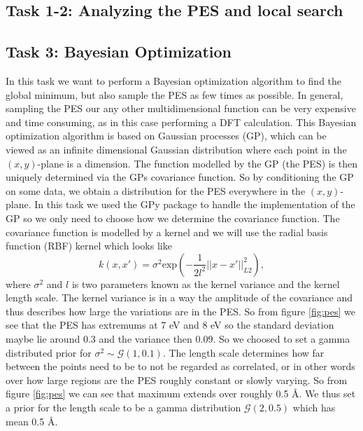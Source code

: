 \documentclass[11pt,a4paper]{article}
\begin{document}
\subsection[Task 1]{Task 1-2: Analyzing the PES and local search}
\label{sec:method_task12}

\subsection[Task 1]{Task 3: Bayesian Optimization}
\label{sec:method_task3}
In this task we want to perform a Bayesian optimization algorithm to find the global minimum, but also sample the PES as few times as possible. In general, sampling the PES our any other multidimensional function can be very expensive and time consuming, as in this case performing a DFT calculation. This Bayesian optimization algorithm is based on Gaussian processes (GP), which can be viewed as an infinite dimensional Gaussian distribution where each point in the $(x,y)$-plane is a dimension. The function modelled by the GP (the PES) is then uniquely determined via the GPs covariance function. So by conditioning the GP on some data, we obtain a distribution for the PES everywhere in the $(x,y)$-plane. In this task we used the GPy package to handle the implementation of the GP so we only need to choose how we determine the covariance function. The covariance function is modelled by a kernel and we will use the radial basis function (RBF) kernel which looks like 
\begin{equation*}
    k(x, x') = \sigma^2 \text{exp}(-\frac{1}{2l^2}||x - x'||_{L2}^2),
\end{equation*}
where $\sigma^2$ and $l$ is two parameters known as the kernel variance and the kernel length scale. The kernel variance is in a way the amplitude of the covariance and thus describes how large the variations are in the PES. So from figure \ref{fig:pes} we see that the PES has extremums  at 7 eV and 8 eV so the standard deviation maybe lie around 0.3 and the variance then 0.09. So we choosed to set a gamma distributed prior for $\sigma^2 \sim \mathcal{G}(1,0.1)$. The length scale determines how far between the points need to be to not be regarded as correlated, or in other words over how large regions are the PES roughly constant or slowly varying. So from figure \ref{fig:pes} we can see that maximum extends over roughly 0.5 Å. We thus set a prior for the length scale to be a gamma distribution $\mathcal{G}(2,0.5)$ which has mean 0.5 Å.
\\
\end{document}
